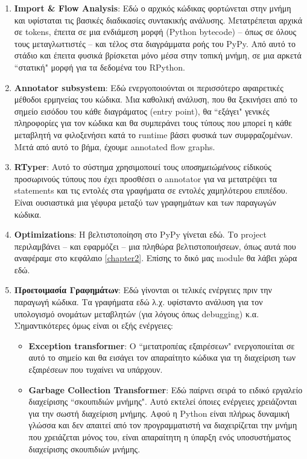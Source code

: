 \begin{enumerate}

\item \textbf{Import \& Flow Analysis}: Εδώ ο αρχικός κώδικας φορτώνεται στην
μνήμη και υφίσταται τις βασικές διαδικασίες συντακικής ανάλυσης. Μετατρέπεται
αρχικά σε tokens, έπειτα σε μια ενδιάμεση μορφή (Python bytecode) – όπως σε
όλους τους μεταγλωττιστές – και τέλος στα διαγράμματα ροής του PyPy. Από αυτό
το στάδιο και έπειτα φυσικά βρίσκεται μόνο μέσα στην τοπική μνήμη, σε μια 
αρκετά ``στατική" μορφή για τα δεδομένα του RPython.

\item \textbf{Annotator subsystem}: Εδώ ενεργοποιούνται οι περισσότερο
αφαιρετικές μέθοδοι ερμηνείας του κώδικα. Μια καθολική ανάλυση, που θα 
ξεκινήσει από το σημείο εισόδου του κάθε διαγράματος (entry point), θα ``εξάγει"
γενικές πληροφορίες για τον κώδικα και θα συμπεράνει τους τύπους που μπορεί η 
κάθε μεταβλητή να φιλοξενήσει κατά το runtime βάσει φυσικά των συμφραζομένων.
Μετά από αυτό το βήμα, έχουμε annotated flow graphs.

\item \textbf{RTyper}: Αυτό το σύστημα χρησιμοποιεί τους
\textit{υποσημειώμένους} είδικούς προσωρινούς τύπους που έχει προσθέσει ο
annotator για να μετατρέψει τα statements και τις εντολές στα γραφήματα σε
εντολές χαμηλότερου επιπέδου. Είναι ουσιαστικά μια γέφυρα μεταξύ των γραφημάτων
και των παραγωγών κώδικα.

\item \textbf{Optimizations}: Η βελτιστοποίηση στο PyPy γίνεται εδώ. Το project
περιλαμβάνει – και εφαρμόζει –  μια πληθώρα βελτιστοποιήσεων, όπως αυτά που
αναφέραμε στο κεφάλαιο \ref{chapter2}. Επίσης το δικό μας module θα λάβει χώρα
εδώ.

\item \textbf{Προετοιμασία Γραφημάτων}: Εδώ γίνονται οι τελικές ενέργειες πριν
την παραγωγή κώδικα. Τα γραφήματα εδώ λ.χ. υφίσταντο ανάλυση για τον υπολογισμό
ονομάτων μεταβλητών (για λόγους όπως debugging) κ.α. Σημαντικότερες όμως είναι
οι εξής ενέργειες:

\begin{itemize}

\item \textbf{Exception transformer}: Ο ``μετατροπέας εξαιρέσεων" ενεργοποιείται
σε αυτό το σημείο και θα εισάγει τον απαραίτητο κώδικα για τη διαχείριση των
εξαιρέσεων που τυχαίνει να υπάρχουν.

\item \textbf{Garbage Collection Transformer}: Εδώ παίρνει σειρά το ειδικό
εργαλείο διαχείρισης ``σκουπιδιών μνήμης". Αυτό εκτελεί όποιες ενέργειες
χρειάζονται για την σωστή διαχείριση μνήμης. Αφού η Python είναι πλήρως 
δυναμική γλώσσα και δεν απαιτεί από τον προγραμματιστή να διαχειρίζεται την 
μνήμη που χρειάζεται μόνος του, είναι απαραίτητη η ύπαρξη ενός υποσυστήματος
διαχείρισης σκουπιδιών μνήμης.


\end{itemize}
\end{enumerate}
